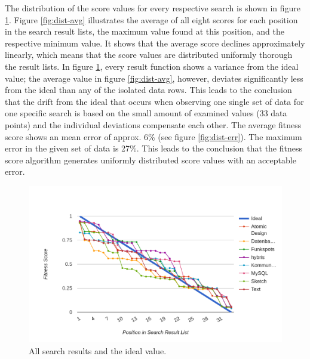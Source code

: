 The distribution of the score values for every respective search is shown in figure \ref{fig:dist-raw}.
Figure \ref{fig:dist-avg} illustrates the average of all eight scores for each position in the search result lists, the maximum value found at this position, and the respective minimum value.
It shows that the average score declines approximately linearly, which means that the score values are distributed uniformly thorough the result lists. In figure \ref{fig:dist-raw}, every result function shows a variance from the ideal value; the average value in figure \ref{fig:dist-avg}, however, deviates significantly less from the ideal than any of the isolated data rows. This leads to the conclusion that the drift from the ideal that occurs when observing one single set of data for one specific search is based on the small amount of examined values (33 data points) and the individual deviations compensate each other. The average fitness score shows an mean error of approx. 6\% (see figure \ref{fig:dist-err}). The maximum error in the given set of data is 27\%.
This leads to the conclusion that the fitness score algorithm generates uniformly distributed score values with an acceptable error.\\

\begin{figure}[H]
    \centering
    \includegraphics[width=\textwidth]{images/dist_raw.png}
    \caption[Diagram: Fitness Score Distribution (Raw)]{All search results and the ideal value.}
    \label{fig:dist-raw}
\end{figure}

